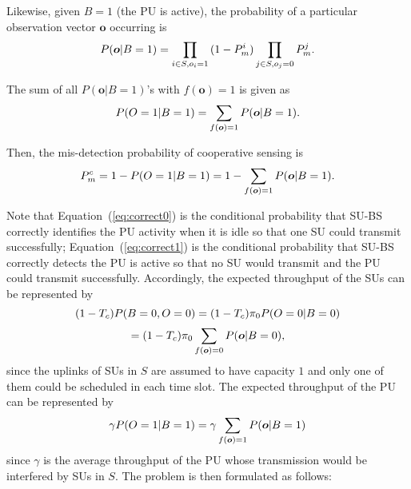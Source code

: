 \documentclass[conference]{IEEEtran}
\begin{document}
Likewise, given $B=1$ (the PU is active), the probability of a particular observation vector $\boldsymbol{o}$ occurring is 
\vspace{-0.2em}
\begin{equation}
P(\boldsymbol{o}|B=1)=\prod\limits_{i\in S,o_i=1}{(1-P_m^i)} \prod\limits_{j\in S,o_j=0}{P_m^j}.
\vspace{-0.5em}
\end{equation}

The sum of all $P(\boldsymbol{o}|B=1)$'s with $f(\boldsymbol{o})=1$ is given as 
\vspace{-0.5em}
\begin{equation}
P(O=1|B=1)=\sum\limits_{f(\boldsymbol{o})=1}{P(\boldsymbol{o}|B=1)}.
\vspace{-0.5em}
\label{eq:correct1}
\end{equation}

Then, the mis-detection probability of cooperative sensing is 
\vspace{-0.5em}
\begin{equation} 
P_m^c=1-P(O=1|B=1)=1-\sum\limits_{f(\boldsymbol{o})=1}{P(\boldsymbol{o}|B=1)}.
\vspace{-0.5em}
\label{eq:bin1prob}
\end{equation}

Note that Equation~(\ref{eq:correct0}) is the conditional probability that SU-BS correctly identifies the PU activity when it is idle so that one SU could transmit successfully; Equation~(\ref{eq:correct1}) is the conditional probability that SU-BS correctly detects the PU is active so that no SU would transmit and the PU could transmit successfully. Accordingly, the expected throughput of the SUs can be represented by
\vspace{-0.5em}
\[
(1-T_c)P(B=0,O=0)=(1-T_c){\pi}_0 P(O=0|B=0)
\vspace{-0.2em}\]
\begin{equation}
=(1-T_c){\pi}_0 \sum\limits_{f(\boldsymbol{o})=0}{P(\boldsymbol{o}|B=0)},\vspace{-0.3em}
\end{equation}
since the uplinks of SUs in $S$ are assumed to have capacity $1$ and only one of them could be scheduled in each time slot. The expected throughput of the PU can be represented by
\vspace{-0.5em}
\begin{equation}
\gamma P(O=1|B=1)=\gamma \sum\limits_{f(\boldsymbol{o})=1}{P(\boldsymbol{o}|B=1)}
\vspace{-0.5em}
\end{equation}
since $\gamma$ is the average throughput of the PU whose transmission would be interfered by SUs in $S$. The problem is then formulated as follows:
\end{document}
